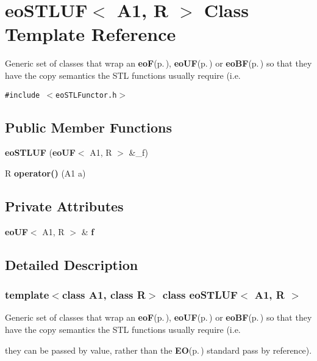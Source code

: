 \section{eo\-STLUF$<$ A1, R $>$ Class Template Reference}
\label{classeo_s_t_l_u_f}
Generic set of classes that wrap an {\bf eo\-F}{\rm (p.\,\pageref{classeo_f})}, {\bf eo\-UF}{\rm (p.\,\pageref{classeo_u_f})} or {\bf eo\-BF}{\rm (p.\,\pageref{classeo_b_f})} so that they have the copy semantics the STL functions usually require (i.e.  


{\tt \#include $<$eo\-STLFunctor.h$>$}

\subsection*{Public Member Functions}
\begin{CompactItemize}
\item 
{\bf eo\-STLUF} ({\bf eo\-UF}$<$ A1, R $>$ \&\_\-f)\label{classeo_s_t_l_u_f_a0}

\item 
R {\bf operator()} (A1 a)\label{classeo_s_t_l_u_f_a1}

\end{CompactItemize}
\subsection*{Private Attributes}
\begin{CompactItemize}
\item 
{\bf eo\-UF}$<$ A1, R $>$ \& {\bf f}\label{classeo_s_t_l_u_f_r0}

\end{CompactItemize}


\subsection{Detailed Description}
\subsubsection*{template$<$class A1, class R$>$ class eo\-STLUF$<$ A1, R $>$}

Generic set of classes that wrap an {\bf eo\-F}{\rm (p.\,\pageref{classeo_f})}, {\bf eo\-UF}{\rm (p.\,\pageref{classeo_u_f})} or {\bf eo\-BF}{\rm (p.\,\pageref{classeo_b_f})} so that they have the copy semantics the STL functions usually require (i.e. 

they can be passed by value, rather than the {\bf EO}{\rm (p.\,\pageref{class_e_o})} standard pass by reference).

